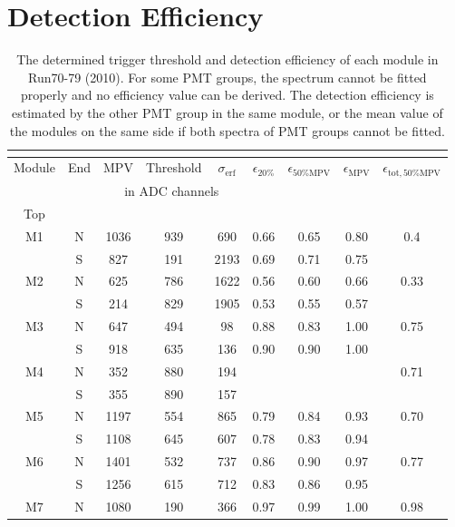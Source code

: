 \section{Detection Efficiency}
\label{sec:appendix}

\small
\begin{longtable}{c c c c c c c c c}
  \caption{The determined trigger threshold and detection efficiency of each module in Run70-79 (2010). For some PMT groups, the spectrum cannot be fitted properly and no efficiency value can be derived. The detection efficiency is estimated by the other PMT group in the same module, or the mean value of the modules on the same side if both spectra of PMT groups cannot be fitted. } \\
  \label{tab:mpv-full}\\
  \toprule
  Module & End & MPV & Threshold & $\sigma{}_{\mathrm{erf}}$ & $\epsilon_{20\%}$ & $\epsilon_{50\%\mathrm{MPV}}$ & $\epsilon_{\mathrm{MPV}}$ & $\epsilon_{\mathrm{tot}, 50\%\mathrm{MPV}}$ \\
         &     & \multicolumn{3}{|c|}{in ADC channels} &   \\
  \midrule
  \endfirsthead
  Top\\
  \midrule
  M1 & N & 1036 & 939 & 690 & 0.66 & 0.65 & 0.80 & \multirow{2}{*}{0.4}\\
     & S & 827 & 191 & 2193 & 0.69 & 0.71 & 0.75 & \\
  M2 & N & 625 & 786 & 1622 & 0.56 & 0.60 & 0.66 & \multirow{2}{*}{0.33}\\
     & S & 214 & 829 & 1905 & 0.53 & 0.55 & 0.57 & \\
  M3 & N & 647 & 494 & 98 & 0.88 & 0.83 & 1.00   & \multirow{2}{*}{0.75}\\
     & S & 918 & 635 & 136 & 0.90 & 0.90 & 1.00  & \\
  M4 & N & 352 & 880 & 194 &   &   &             & \multirow{2}{*}{0.71}\\
     & S & 355 & 890 & 157 &   &   &             & \\
  M5 & N & 1197 & 554 & 865 & 0.79 & 0.84 & 0.93 & \multirow{2}{*}{0.70}\\
     & S & 1108 & 645 & 607 & 0.78 & 0.83 & 0.94 & \\
  M6 & N & 1401 & 532 & 737 & 0.86 & 0.90 & 0.97 & \multirow{2}{*}{0.77}\\
     & S & 1256 & 615 & 712 & 0.83 & 0.86 & 0.95 & \\
  M7 & N & 1080 & 190 & 366 & 0.97 & 0.99 & 1.00 & \multirow{2}{*}{0.98}\\

\end{longtable}
